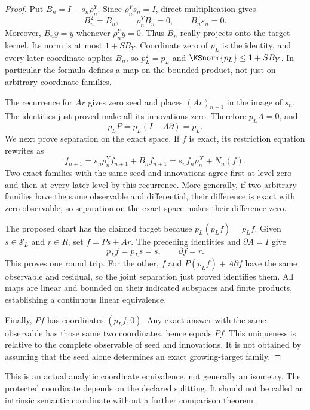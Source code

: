 \begin{proof}
Put \(B_n=I-s_n\rho^Y_n\). Since \(\rho^Y_ns_n=I\), direct multiplication gives
\[
 B_n^2=B_n,\qquad \rho^Y_nB_n=0,\qquad B_ns_n=0.
\]
Moreover, \(B_ny=y\) whenever \(\rho^Y_ny=0\). Thus \(B_n\) really projects onto the target kernel. Its norm is at most \(1+SB_Y\). Coordinate zero of \(p_L\) is the identity, and every later coordinate applies \(B_n\), so \(p_L^2=p_L\) and \(\KSnorm{p_L}\le1+SB_Y\). In particular the formula defines a map on the bounded product, not just on arbitrary coordinate families.

The recurrence for \(Ar\) gives zero seed and places \((Ar)_{n+1}\) in the image of \(s_n\). The identities just proved make all its innovations zero. Therefore \(p_LA=0\), and
\[
 p_LP=p_L(I-A\partial)=p_L.
\]
We next prove separation on the exact space. If \(f\) is exact, its restriction equation rewrites as
\[
 f_{n+1}=s_n\rho^Y_nf_{n+1}+B_nf_{n+1}
          =s_nf_n\rho^X_n+N_n(f).
\]
Two exact families with the same seed and innovations agree first at level zero and then at every later level by this recurrence. More generally, if two arbitrary families have the same observable and differential, their difference is exact with zero observable, so separation on the exact space makes their difference zero.

The proposed chart has the claimed target because \(p_L(p_Lf)=p_Lf\). Given \(s\in\mathcal S_L\) and \(r\in R\), set \(f=Ps+Ar\). The preceding identities and \(\partial A=I\) give
\[
 p_Lf=p_Ls=s,\qquad \partial f=r.
\]
This proves one round trip. For the other, \(f\) and \(P(p_Lf)+A\partial f\) have the same observable and residual, so the joint separation just proved identifies them. All maps are linear and bounded on their indicated subspaces and finite products, establishing a continuous linear equivalence.

Finally, \(Pf\) has coordinates \((p_Lf,0)\). Any exact answer with the same observable has those same two coordinates, hence equals \(Pf\). This uniqueness is relative to the complete observable of seed and innovations. It is not obtained by assuming that the seed alone determines an exact growing-target family.
\end{proof}
This is an actual analytic coordinate equivalence, not generally an isometry. The protected coordinate depends on the declared splitting. It should not be called an intrinsic semantic coordinate without a further comparison theorem.

